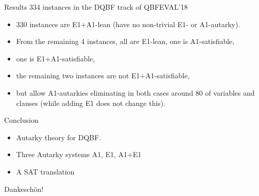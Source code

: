 \documentclass[xcolor=table	]{beamer}
\begin{document}
\begin{frame}{Results}
334 instances in the DQBF track of QBFEVAL'18 

\begin{itemize}
    \item 330 instances are E1+A1-lean (have no non-trivial E1- or A1-autarky). 
    \item From the remaining 4 instances, all are E1-lean, one is A1-satisfiable, 
    \item one is E1+A1-satisfiable, 
    \item the remaining two instances are not E1+A1-satisfiable,
    \item but allow A1-autarkies eliminating in both cases around 80 of variables
and clauses (while adding E1 does not change this).
\end{itemize}

\end{frame}

%  
%  
%   

\begin{frame}{Conclusion}
\begin{itemize}
\item Autarky theory for DQBF.
\item Three Autarky systems A1, E1, A1+E1
\item A SAT translation 
\end{itemize}
\vspace{1cm}
\Large
Dankeschön!
\end{frame}
\end{document}
